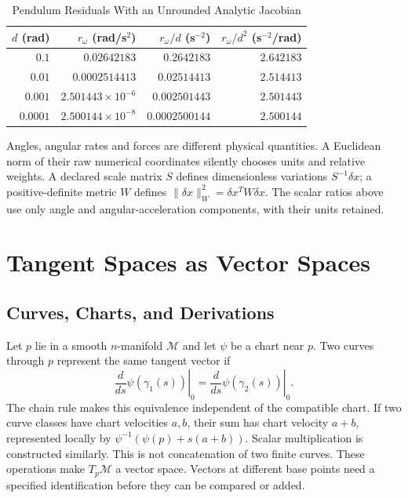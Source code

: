 \begin{table}[htbp]
\centering
\caption{Pendulum Residuals With an Unrounded Analytic Jacobian}
\label{tab:foundations:pendulum}
\begin{tabular}{@{}rrrr@{}}
\toprule
$d$ (rad) & $r_\omega$ (rad/s$^2$) & $r_\omega/d$ (s$^{-2}$) & $r_\omega/d^2$ (s$^{-2}$/rad) \\
\midrule
$0.1$ & $0.02642183$ & $0.2642183$ & $2.642183$ \\
$0.01$ & $0.0002514413$ & $0.02514413$ & $2.514413$ \\
$0.001$ & $2.501443\times10^{-6}$ & $0.002501443$ & $2.501443$ \\
$0.0001$ & $2.500144\times10^{-8}$ & $0.0002500144$ & $2.500144$ \\
\bottomrule
\end{tabular}
\end{table}

Angles, angular rates and forces are different physical quantities. A Euclidean norm of
their raw numerical coordinates silently chooses units and relative weights. A declared
scale matrix $S$ defines dimensionless variations $S^{-1}\delta x$; a positive-definite
metric $W$ defines $\|\delta x\|_W^2=\delta x^TW\delta x$. The scalar ratios above use
only angle and angular-acceleration components, with their units retained.

\section{Tangent Spaces as Vector Spaces}

\subsection{Curves, Charts, and Derivations}
\label{def:tangent-space}
Let $p$ lie in a smooth $n$-manifold $\mathcal M$ and let $\psi$ be a chart near $p$.
Two curves through $p$ represent the same tangent vector if
\begin{equation}
\left.\frac{d}{ds}\psi(\gamma_1(s))\right|_0
=\left.\frac{d}{ds}\psi(\gamma_2(s))\right|_0.
\label{eq:ch1:curve-equivalence}
\end{equation}
The chain rule makes this equivalence independent of the compatible chart. If two curve
classes have chart velocities $a,b$, their sum has chart velocity $a+b$, represented
locally by $\psi^{-1}(\psi(p)+s(a+b))$. Scalar multiplication is constructed similarly.
This is not concatenation of two finite curves. These operations make $T_p\mathcal M$
a vector space. Vectors at different base points need a specified identification before
they can be compared or added.


